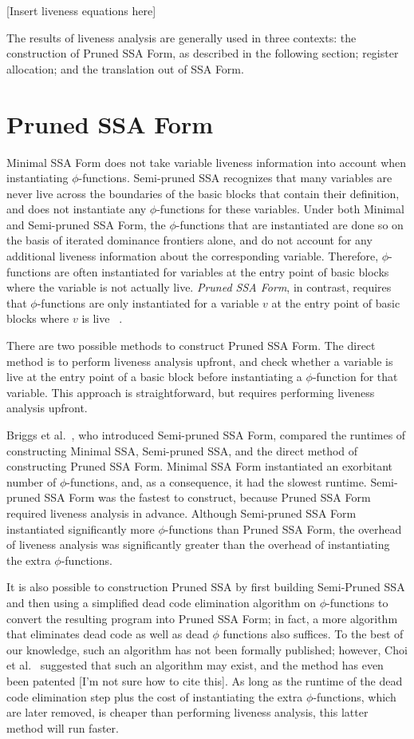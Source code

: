 [Insert liveness equations here]

The results of liveness analysis are generally used in
three contexts: the construction of Pruned SSA Form,
as described in the following section; register allocation;
and the translation out of SSA Form. 

\section{Pruned SSA Form}

Minimal SSA Form does not take variable liveness information
into account when instantiating $\phi$-functions. Semi-pruned
SSA recognizes that many variables are never live across
the boundaries of the basic blocks that contain their 
definition, and does not instantiate any $\phi$-functions
for these variables. Under both Minimal and Semi-pruned
SSA Form, the $\phi$-functions that are instantiated are
done so on the basis of iterated dominance frontiers alone,
and do not account for any additional liveness information
about the corresponding variable. Therefore, $\phi$-functions
are often instantiated for variables at the entry point of
basic blocks where the variable is not actually live. 
\emph{Pruned SSA Form}, in contrast, requires that 
$\phi$-functions are only instantiated for a variable $v$
at the entry point of basic blocks where $v$ is live
~\cite{ChoiJan91}.  

There are two possible methods to construct Pruned SSA Form.
The direct method is to perform liveness analysis upfront, and
check whether a variable is live at the entry point of a 
basic block before instantiating a $\phi$-function for that
variable. This approach is straightforward, but requires
performing liveness analysis upfront. 

Briggs et al.~\cite{BriggsJul98}, who introduced Semi-pruned
SSA Form, compared the runtimes of constructing Minimal SSA,
Semi-pruned SSA, and the direct method of constructing Pruned
SSA Form. Minimal SSA Form instantiated an exorbitant number
of $\phi$-functions, and, as a consequence, it had the slowest
runtime. Semi-pruned SSA Form was the fastest to construct,
because Pruned SSA Form required liveness analysis in advance.
Although Semi-pruned SSA Form instantiated significantly 
more $\phi$-functions than Pruned SSA Form, the overhead of
liveness analysis was significantly greater than the overhead
of instantiating the extra $\phi$-functions. 

It is also possible to construction Pruned SSA by first
building Semi-Pruned SSA and then using a simplified dead code
elimination algorithm on $\phi$-functions to convert the
resulting program into Pruned SSA Form; in fact, a more
algorithm that eliminates dead code as well as dead $\phi$
functions also suffices. To the best of our knowledge, such
an algorithm has not been formally published; however, Choi
et al.~\cite{ChoiJan91} suggested that such an algorithm
may exist, and the method has even been patented
[I'm not sure how to cite this]. As long as the runtime of
the dead code elimination step plus the cost of instantiating
the extra $\phi$-functions, which are later removed, is 
cheaper than performing liveness analysis, this latter
method will run faster. 

